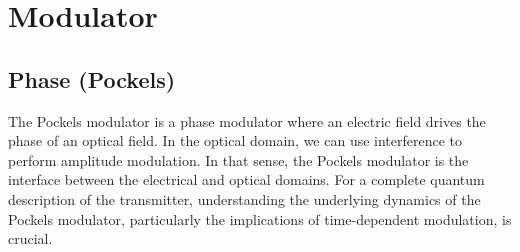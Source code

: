 \section{Modulator}

\subsection{Phase (Pockels)}

The Pockels modulator is a phase modulator where an electric field drives the phase of an optical field.
In the optical domain, we can use interference to perform amplitude modulation.
In that sense, the Pockels modulator is the interface between the electrical and optical domains.
For a complete quantum description of the transmitter, understanding the underlying dynamics of the Pockels modulator, particularly the implications of time-dependent modulation, is crucial.


